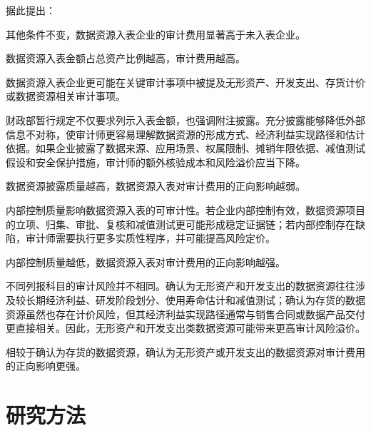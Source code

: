 \documentclass[UTF8,zihao=-4,a4paper]{ctexart}
\begin{document}
据此提出：

\begin{description}[leftmargin=3.2em,style=nextline]
  \item[H1] 其他条件不变，数据资源入表企业的审计费用显著高于未入表企业。
  \item[H1a] 数据资源入表金额占总资产比例越高，审计费用越高。
  \item[H1b] 数据资源入表企业更可能在关键审计事项中被提及无形资产、开发支出、存货计价或数据资源相关审计事项。
\end{description}

财政部暂行规定不仅要求列示入表金额，也强调附注披露。充分披露能够降低外部信息不对称，使审计师更容易理解数据资源的形成方式、经济利益实现路径和估计依据。如果企业披露了数据来源、应用场景、权属限制、摊销年限依据、减值测试假设和安全保护措施，审计师的额外核验成本和风险溢价应当下降。

\begin{description}[leftmargin=3.2em,style=nextline]
  \item[H2] 数据资源披露质量越高，数据资源入表对审计费用的正向影响越弱。
\end{description}

内部控制质量影响数据资源入表的可审计性。若企业内部控制有效，数据资源项目的立项、归集、审批、复核和减值测试更可能形成稳定证据链；若内部控制存在缺陷，审计师需要执行更多实质性程序，并可能提高风险定价。

\begin{description}[leftmargin=3.2em,style=nextline]
  \item[H3] 内部控制质量越低，数据资源入表对审计费用的正向影响越强。
\end{description}

不同列报科目的审计风险并不相同。确认为无形资产和开发支出的数据资源往往涉及较长期经济利益、研发阶段划分、使用寿命估计和减值测试；确认为存货的数据资源虽然也存在计价风险，但其经济利益实现路径通常与销售合同或数据产品交付更直接相关。因此，无形资产和开发支出类数据资源可能带来更高审计风险溢价。

\begin{description}[leftmargin=3.2em,style=nextline]
  \item[H4] 相较于确认为存货的数据资源，确认为无形资产或开发支出的数据资源对审计费用的正向影响更强。
\end{description}

\section{研究方法}
\end{document}
